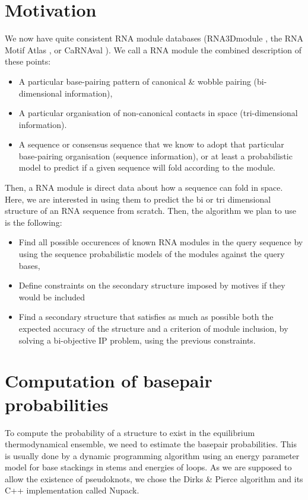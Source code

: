 \documentclass{article}
\begin{document}
\section{Motivation}
We now have quite consistent RNA module databases (RNA3Dmodule \cite{djelloul_automated_2008}, the RNA Motif Atlas \cite{petrov_automated_2013}, or CaRNAval \cite{reinharz2018mining}). 
We call a RNA module the combined description of these points:
\begin{itemize}
	\item A particular base-pairing pattern of canonical \& wobble pairing (bi-dimensional information),
	\item A particular organisation of non-canonical contacts in space (tri-dimensional information).
	\item A sequence or consensus sequence that we know to adopt that particular base-pairing organisation (sequence information), or at least a probabilistic model to predict if a given sequence will fold according to the module.
\end{itemize}
Then, a RNA module is direct data about how a sequence can fold in space. Here, we are interested in using them to predict the bi or tri dimensional structure of an RNA sequence from scratch. 
Then, the algorithm we plan to use is the following:
	
\begin{itemize}
	\item Find all possible occurences of known RNA modules in the query sequence by using the sequence probabilistic models of the modules against the query bases,
	\item Define constraints on the secondary structure imposed by motives if they would be included
	\item Find a secondary structure that satisfies as much as possible both the expected accuracy of the structure and a criterion of module inclusion, by solving a bi-objective IP problem, using the previous constraints.
\end{itemize}

\section{Computation of basepair probabilities}
To compute the probability of a structure to exist in the equilibrium thermodynamical ensemble, we need to estimate the basepair probabilities.
This is usually done by a dynamic programming algorithm using an energy parameter model for base stackings in stems and energies of loops.
As we are supposed to allow the existence of pseudoknots, we chose the Dirks \& Pierce algorithm \cite{dirksAlgorithmComputingNucleic2004} and its C++ implementation called Nupack.
\end{document}
